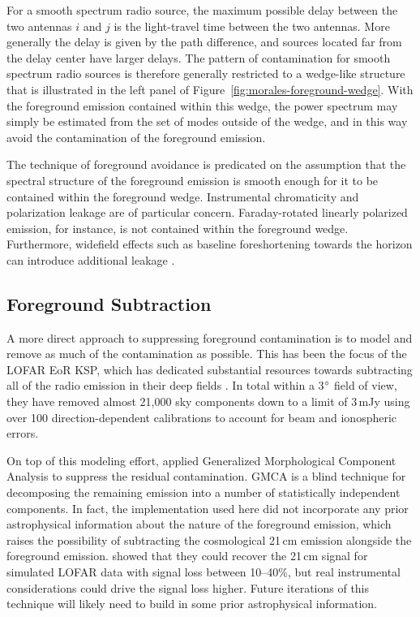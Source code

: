 \begin{bibunit}
For a smooth spectrum radio source, the maximum possible delay between the two antennas $i$ and $j$
is the light-travel time between the two antennas. More generally the delay is given by the path
difference, and sources located far from the delay center have larger delays. The pattern of
contamination for smooth spectrum radio sources is therefore generally restricted to a wedge-like
structure that is illustrated in the left panel of Figure~\ref{fig:morales-foreground-wedge}.  With
the foreground emission contained within this wedge, the power spectrum may simply be estimated from
the set of modes outside of the wedge, and in this way avoid the contamination of the foreground
emission.

The technique of foreground avoidance is predicated on the assumption that the spectral structure of
the foreground emission is smooth enough for it to be contained within the foreground wedge.
Instrumental chromaticity and polarization leakage are of particular concern. Faraday-rotated
linearly polarized emission, for instance, is not contained within the foreground wedge.
Furthermore, widefield effects such as baseline foreshortening towards the horizon can introduce
additional leakage \citep{2015ApJ...804...14T}.

\subsection{Foreground Subtraction}

A more direct approach to suppressing foreground contamination is to model and remove as much of the
contamination as possible. This has been the focus of the LOFAR EoR KSP, which has dedicated
substantial resources towards subtracting all of the radio emission in their deep fields
\citep{2017ApJ...838...65P}. In total within a 3$\mbox{$^\circ$}$ field of view, they have removed almost
21,000 sky components down to a limit of 3\,mJy using over 100 direction-dependent calibrations to
account for beam and ionospheric errors.

On top of this modeling effort, \citet{2017ApJ...838...65P} applied Generalized Morphological
Component Analysis \citep[GMCA;][]{2013MNRAS.429..165C} to suppress the residual contamination.
GMCA is a blind technique for decomposing the remaining emission into a number of statistically
independent components. In fact, the implementation used here did not incorporate any prior
astrophysical information about the nature of the foreground emission, which raises the possibility
of subtracting the cosmological 21\,cm emission alongside the foreground emission.
\citet{2013MNRAS.429..165C} showed that they could recover the 21\,cm signal for simulated LOFAR
data with signal loss between 10--40\%, but real instrumental considerations could drive the signal
loss higher. Future iterations of this technique will likely need to build in some prior
astrophysical information.


\end{bibunit}
